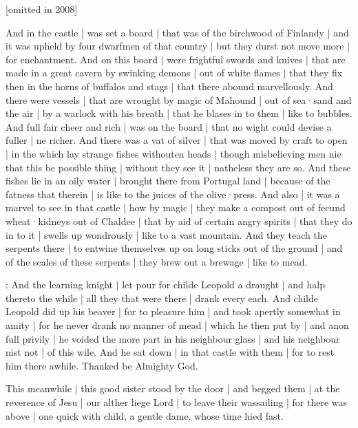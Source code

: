 
[omitted in 2008]

And in the castle |
was set a board |
that was of the birchwood of Finlandy |
and it was upheld by four dwarfmen of that country |
but they durst not move more |
for enchantment.
And on this board |
were frightful swords and knives |
that are made in a great cavern by swinking demons |
out of white flames |
that they fix then in the horns of buffalos and stags |
that there abound marvellously.
And there were vessels |
that are wrought by magic of Mahound |
out of sea·sand and the air |
by a warlock with his breath |
that he blases in to them |
like to bubbles.
And full fair cheer and rich |
was on the board |
that no wight could devise a fuller |
ne richer.
And there was a vat of silver |
that was moved by craft to open |
in the which lay strange fishes withouten heads |
though misbelieving men nie that this be possible thing |
without they see it |
natheless they are so.
And these fishes lie in an oily water |
brought there from Portugal land |
because of the fatness that therein |
is like to the juices of the olive·press.
And also |
it was a marvel to see in that castle |
how by magic |
they make a compost out of fecund wheat·kidneys out of Chaldee |
that by aid of certain angry spirits |
that they do in to it |
swells up wondrously |
like to a vast mountain.
And they teach the serpents there |
to entwine themselves up on long sticks out of the ground |
and of the scales of these serpents |
they brew out a brewage |
like to mead.


:
And the learning knight |
let pour for childe Leopold a draught |
and halp thereto the while |
all they that were there |
drank every each.
And childe Leopold did up his beaver |
for to pleasure him |
and took apertly somewhat in amity |
for he never drank no manner of mead |
which he then put by |
and anon full privily |
he voided the more part in his neighbour glass |
and his neighbour nist not |
of this wile.
And he sat down |
in that castle with them |
for to rest him there awhile.
Thanked be Almighty God.



This meanwhile |
this good sister stood by the door |
and begged them |
at the reverence of Jesu |
our alther liege Lord |
to leave their wassailing |
for there was above |
one quick with child,
a gentle dame,
whose time hied fast.

